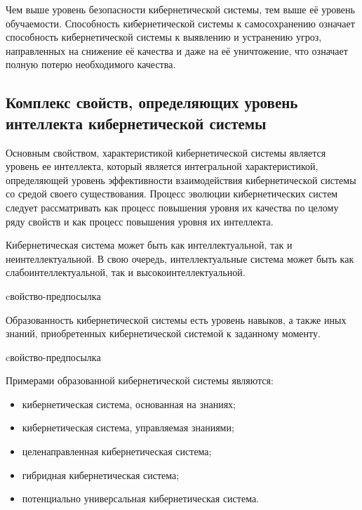 Чем выше уровень безопасности кибернетической системы, тем выше её уровень обучаемости.
Способность кибернетической системы к самосохранению означает способность кибернетической системы к выявлению и устранению угроз, направленных на снижение её качества и даже на её уничтожение, что означает полную потерю необходимого качества.


\subsection{Комплекс свойств, определяющих уровень интеллекта кибернетической системы}
{\label{sec_cyb_syst_intelligence_quality}} 

Основным свойством, характеристикой кибернетической системы является уровень ее интеллекта, который является интегральной характеристикой, определяющей уровень эффективности взаимодействия кибернетической системы со средой своего существования.
Процесс эволюции кибернетических систем следует рассматривать как процесс повышения уровня их качества по целому ряду свойств и как процесс повышения уровня их интеллекта.

Кибернетическая система может быть как интеллектуальной, так и неинтеллектуальной. В свою очередь, интеллектуальные система может быть как слабоинтеллектуальной, так и высокоинтеллектуальной.

\begin{SCn}
\begin{scnrelfromlist}{cвойство-предпосылка}
\end{scnrelfromlist}
\end{SCn}

Образованность кибернетической системы есть уровень навыков, а также иных знаний, приобретенных кибернетической системой к заданному моменту. 

\begin{SCn}
\begin{scnrelfromlist}{cвойство-предпосылка}
\end{scnrelfromlist}
\end{SCn}

Примерами образованной кибернетической системы являются:
\begin{itemize}
    \item{кибернетическая система, основанная на знаниях;}
    \item{кибернетическая система, управляемая знаниями;}
    \item{целенаправленная кибернетическая система;}
    \item{гибридная кибернетическая система;}
    \item{потенциально универсальная кибернетическая система.}
\end{itemize}

